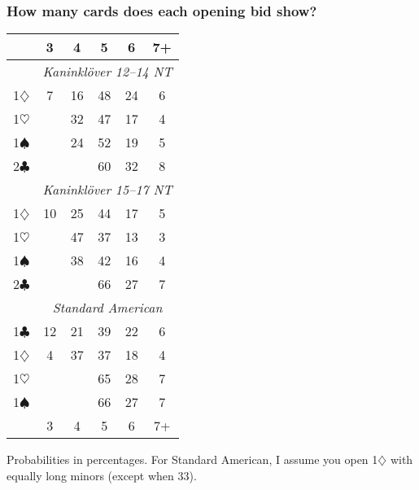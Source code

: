 \documentclass[a4paper, twoside, 11pt]{article}
\begin{document}
\begin{multicols}{3}
\subsubsection*{How many cards does each opening bid show?}
\begin{center}
\begin{tabular}{ |r|ccccc| }
\hline
  & 3 & 4 & 5 & 6 & 7+ \\
 \hline
& \multicolumn{5}{|c|}{\textit{Kaninklöver 12--14 NT}} \\
1$\diamondsuit$ & 7 & 16 & 48 & 24 & 6 \\
1$\heartsuit$ & & 32 & 47 & 17 & 4 \\
 1$\spadesuit$ & & 24 & 52 & 19 & 5 \\
2$\clubsuit$ & & & 60 & 32 & 8 \\
 \hline
 & \multicolumn{5}{|c|}{\textit{Kaninklöver 15--17 NT}} \\
1$\diamondsuit$ & 10 & 25 & 44 & 17 & 5 \\
1$\heartsuit$ & & 47 & 37 & 13 & 3 \\
 1$\spadesuit$ & & 38 & 42 & 16 & 4 \\
2$\clubsuit$ & & & 66 & 27 & 7 \\
 \hline
 & \multicolumn{5}{|c|}{\textit{Standard American}} \\
1$\clubsuit$ & 12 & 21 & 39 & 22 & 6 \\
1$\diamondsuit$ & 4 & 37 & 37 & 18 & 4 \\
1$\heartsuit$ & & & 65 & 28 & 7 \\
1$\spadesuit$ & & & 66 & 27 & 7  \\
\hline
  & 3 & 4 & 5 & 6 & 7+ \\
 \hline
\end{tabular}
\end{center}



Probabilities in percentages. For Standard American, I assume you open 1$\diamondsuit$ with equally long minors (except when 33).

\end{multicols}
\end{document}
